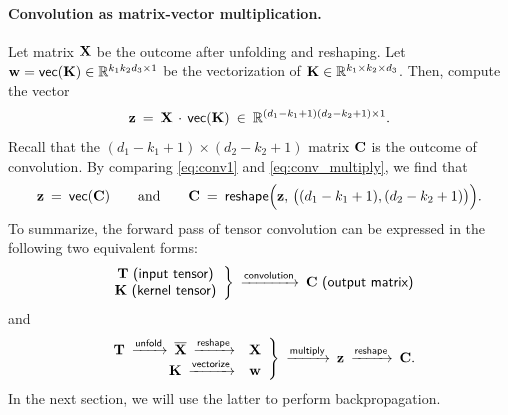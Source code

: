 \documentclass[11pt]{article}
\numberwithin{equation}{section}
\def\C{{\bf C}}
\def\K{{\bf K}}
\def\T{{\bf T}}
\def\w{{\bf w}}
\def\X{{\bf X}}
\def\z{{\bf z}}
\def\RB{{\mathbb R}}
\def\vect{\mathsf{vec}}
\begin{document}
\paragraph{Convolution as matrix-vector multiplication.}
Let matrix $\X$ be the outcome after unfolding and reshaping.
Let $\w = \vect (\K) \in \RB^{k_1 k_2 d_3 \times 1}$ be the vectorization of $\K \in \RB^{k_1 \times k_2 \times d_3}$.
Then, compute the vector
\begin{equation} \label{eq:conv_multiply}
    \z \: = \: \X \, \cdot \, \vect (\K) 
    \: \in \: \RB^{ (d_1 - k_1 + 1)  (d_2 - k_2 + 1)  \times 1} .
\end{equation}
Recall that the $(d_1 - k_1 + 1) \times (d_2 - k_2 + 1)$ matrix $\C$ is the outcome of convolution.
By comparing \eqref{eq:conv1} and \eqref{eq:conv_multiply}, we find that
\begin{equation*}
    \z \: = \: \vect (\C )
    \qquad \textrm{and} \qquad
    \C \: = \: \textsf{reshape} \Big( \z , \, \big( (d_1 - k_1 + 1), (d_2 - k_2 + 1) \big) \Big) .
\end{equation*}
To summarize, the forward pass of tensor convolution can be expressed in the following two equivalent forms:
\begin{equation*}
    \left.
    \begin{array}{c}
         \T \textsf{ (input tensor)} \\
         \K \textsf{ (kernel tensor)} \\
    \end{array}
    \right\}
    \: \xrightarrow{\textsf{convolution}}  \: 
    \C  \textsf{ (output matrix)} 
\end{equation*}
and
\begin{equation} \label{eq:conv2}
    \left.
    \begin{array}{r c}
         \T \: \xrightarrow{\textsf{unfold}} \: \overline{\X} \: \xrightarrow{\textsf{reshape}}  & \X \\
         \K \: \xrightarrow{\textsf{vectorize}} & \w  \\
    \end{array}
    \right\}
    \: \xrightarrow{\textsf{multiply}}  \: 
    \z
    \: \xrightarrow{\textsf{reshape}}  \: 
    \C .
\end{equation}
In the next section, we will use the latter to perform backpropagation.
\end{document}
